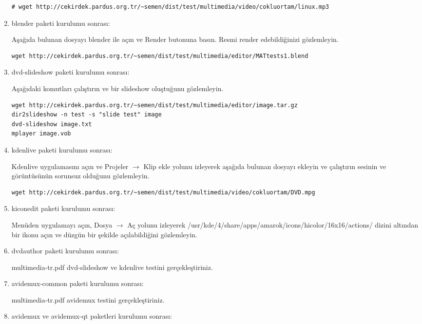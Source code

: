 \documentclass[a4paper,10pt]{article}
\begin{document}
\begin{enumerate}
\begin{verbatim}
# wget http://cekirdek.pardus.org.tr/~semen/dist/test/multimedia/video/cokluortam/linux.mp3 
\end{verbatim}

 \item blender paketi kurulumu sonrası:

Aşağıda bulunan dosyayı blender ile açın ve Render butonuna basın. Resmi render edebildiğinizi gözlemleyin.
\begin{verbatim}
wget http://cekirdek.pardus.org.tr/~semen/dist/test/multimedia/editor/MATtests1.blend 
\end{verbatim}

 \item dvd-slideshow paketi kurulumu sonrası:

Aşağıdaki komutları çalıştırın ve bir slideshow oluştuğunu gözlemleyin.
\begin{verbatim}
wget http://cekirdek.pardus.org.tr/~semen/dist/test/multimedia/editor/image.tar.gz
dir2slideshow -n test -s "slide test" image
dvd-slideshow image.txt
mplayer image.vob 
\end{verbatim}
\item kdenlive paketi kurulumu sonrası:

Kdenlive uygulamasını açın ve Projeler $\rightarrow$ Klip ekle yolunu izleyerek aşağıda bulunan dosyayı ekleyin ve çalıştırın sesinin ve görüntüsünün sorunsuz olduğunu gözlemleyin.
\begin{verbatim}
wget http://cekirdek.pardus.org.tr/~semen/dist/test/multimedia/video/cokluortam/DVD.mpg
\end{verbatim}

\item kiconedit paketi kurulumu sonrası:

Menüden uygulamayı açın, Dosya $\rightarrow$ Aç yolunu izleyerek /usr/kde/4/share/apps/amarok/icons/hicolor/16x16/actions/ dizini altından bir ikonu açın ve düzgün bir şekilde açılabildiğini gözlemleyin.

\item dvdauthor paketi kurulumu sonrası:

multimedia-tr.pdf dvd-slideshow ve kdenlive testini gerçekleştiriniz.

 \item avidemux-common paketi kurulumu sonrası:

 multimedia-tr.pdf avidemux testini gerçekleştiriniz.

 \item avidemux ve avidemux-qt paketleri kurulumu sonrası:


\end{enumerate}
\end{document}
